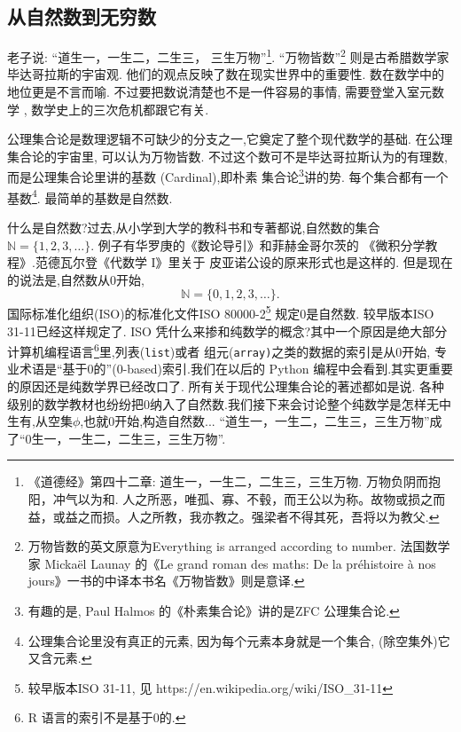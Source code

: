 \documentclass[main.tex]{subfiles}
\begin{document}
\subsection{从自然数到无穷数}
老子说: “道生一，一生二，二生三，
三生万物”\footnote{《道德经》第四十二章: 道生一，一生二，二生三，三生万物. 万物负阴而抱阳，冲气以为和. 人之所恶，唯孤、寡、不毂，而王公以为称。故物或损之而益，或益之而损。人之所教，我亦教之。强梁者不得其死，吾将以为教父.}.
“万物皆数”\footnote{万物皆数的英文原意为Everything is arranged according to number. 
	法国数学家 Mickaël Launay 的《Le grand roman des maths: De la préhistoire à nos jours》一书的中译本书名《万物皆数》则是意译.}
则是古希腊数学家毕达哥拉斯的宇宙观. 他们的观点反映了数在现实世界中的重要性. 数在数学中的地位更是不言而喻.
不过要把数说清楚也不是一件容易的事情, 需要登堂入室元数学
, 数学史上的三次危机都跟它有关. 

公理集合论是数理逻辑不可缺少的分支之一,它奠定了整个现代数学的基础. 在公理集合论的宇宙里, 可以认为万物皆数. 
不过这个数可不是毕达哥拉斯认为的有理数, 而是公理集合论里讲的基数 (Cardinal),即朴素
集合论\footnote{有趣的是, Paul Halmos 的《朴素集合论》讲的是ZFC 公理集合论\cite{HalmosP}.}讲的势. 每个集合都有一个
基数\footnote{公理集合论里没有真正的元素,
因为每个元素本身就是一个集合, (除空集外)它又含元素.}.
最简单的基数是自然数.

什么是自然数?过去,从小学到大学的教科书和专著都说,自然数的集合$\mathbb{N} = \{1, 2, 3, \dots\}$.
例子有华罗庚的《数论导引》\cite{HuaL}和菲赫金哥尔茨的
《微积分学教程》\cite{FeiH1}.范德瓦尔登《代数学 I》\cite{derWaerden}里关于
皮亚诺公设的原来形式也是这样的.
但是现在的说法是,自然数从0开始, 
$$\mathbb{N} = \{0,1, 2, 3, \dots\}.$$
 国际标准化组织(ISO)的标准化文件ISO 80000-2\footnote{较早版本ISO 31-11, 见  https://en.wikipedia.org/wiki/ISO\_31-11}
 规定0是自然数. 较早版本ISO 31-11已经这样规定了. ISO 凭什么来掺和纯数学的概念?其中一个原因是绝大部分计算机编程语言\footnote{R 语言的索引不是基于0的.}里,列表(\texttt{list})或者
 组元(\texttt{array)}之类的数据的索引是从0开始,
 专业术语是“基于0的”(0-based)索引.我们在以后的 Python 编程中会看到.其实更重要的原因还是纯数学界已经改口了.
 所有关于现代公理集合论的著述都如是说\cite{HalmosP}\cite{KelleyJ}\cite{JiangJi}. 各种级别的数学教材也纷纷把0纳入了自然数.我们接下来会讨论整个纯数学是怎样无中生有,从空集$\phi$,也就0开始,构造自然数... 
“道生一，一生二，二生三，三生万物”成了“0生一，一生二，二生三，三生万物”.
\end{document}
